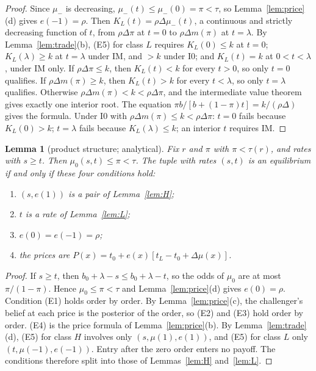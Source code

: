 \documentclass[11pt]{article}
\newtheorem{lemma}{Lemma}
\theoremstyle{definition}
\begin{document}
\begin{proof}
Since $\mu_-$ is decreasing, $\mu_-(t)\le\mu_-(0)=\pi<\tau$, so Lemma~\ref{lem:price}(d) gives $e(-1)=\rho$. Then
$K_L(t)=\rho\Delta\mu_-(t)$, a continuous and strictly decreasing function of $t$, from $\rho\Delta\pi$ at $t=0$ to
$\rho\Delta m(\pi)$ at $t=\lambda$. By Lemma~\ref{lem:trade}(b), (E5) for class $L$ requires $K_L(0)\le k$ at
$t=0$; $K_L(\lambda)\ge k$ at $t=\lambda$ under IM, and $>k$ under I0; and $K_L(t)=k$ at $0<t<\lambda$, under IM
only. If $\rho\Delta\pi\le k$, then $K_L(t)<k$ for every $t>0$, so only $t=0$ qualifies. If $\rho\Delta m(\pi)\ge k$,
then $K_L(t)>k$ for every $t<\lambda$, so only $t=\lambda$ qualifies. Otherwise $\rho\Delta m(\pi)<k<\rho\Delta\pi$,
and the intermediate value theorem gives exactly one interior root. The equation
$\pi b/[b+(1-\pi)t]=k/(\rho\Delta)$ gives the formula. Under I0 with $\rho\Delta m(\pi)\le k<\rho\Delta\pi$: $t=0$
fails because $K_L(0)>k$; $t=\lambda$ fails because $K_L(\lambda)\le k$; an interior $t$ requires IM.
\end{proof}

\begin{lemma}[product structure; analytical]\label{lem:product}
Fix $r$ and $\pi$ with $\pi<\tau(r)$, and rates with $s\ge t$. Then $\mu_0(s,t)\le\pi<\tau$. The tuple with
rates $(s,t)$ is an equilibrium if and only if these four conditions hold:
\begin{enumerate}[label=(\roman*)]
\item $(s,e(1))$ is a pair of Lemma~\ref{lem:H};
\item $t$ is a rate of Lemma~\ref{lem:L};
\item $e(0)=e(-1)=\rho$;
\item the prices are $P(x)=t_0+e(x)[t_L-t_0+\Delta\mu(x)]$.
\end{enumerate}
\end{lemma}

\begin{proof}
If $s\ge t$, then $b_0+\lambda-s\le b_0+\lambda-t$, so the odds of $\mu_0$ are at most $\pi/(1-\pi)$. Hence
$\mu_0\le\pi<\tau$ and Lemma~\ref{lem:price}(d) gives $e(0)=\rho$. Condition (E1) holds order by order. By
Lemma~\ref{lem:price}(c), the challenger's belief at each price is the posterior of the order, so (E2) and (E3) hold
order by order. (E4) is the price formula of Lemma~\ref{lem:price}(b). By Lemma~\ref{lem:trade}(d), (E5) for
class $H$ involves only $(s,\mu(1),e(1))$, and (E5) for class $L$ only $(t,\mu(-1),e(-1))$. Entry after the zero
order enters no payoff. The conditions therefore split into those of Lemmas~\ref{lem:H} and~\ref{lem:L}.
\end{proof}
\end{document}
